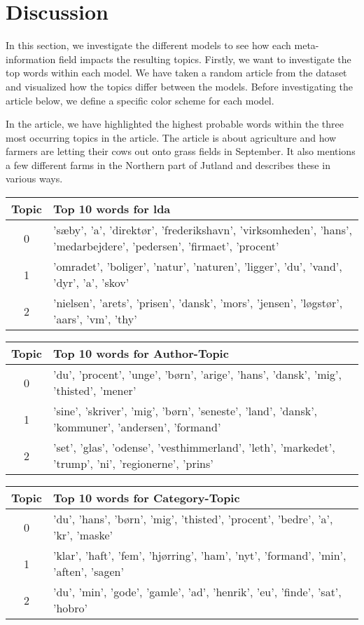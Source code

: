 \section{Discussion}\label{sec:discussion}
In this section, we investigate the different models to see how each meta-information field impacts the resulting topics.
Firstly, we want to investigate the top words within each model.
We have taken a random article from the dataset and visualized how the topics differ between the models. 
Before investigating the article below, we define a specific color scheme for each model.

In the article, we have highlighted the highest probable words within the three most occurring topics in the article.
The article is about agriculture and how farmers are letting their cows out onto grass fields in September. 
It also mentions a few different farms in the Northern part of Jutland and describes these in various ways.

\begin{table}
	\begin{tabular}{c|p{}}
		Topic & Top 10 words for \gls{lda} \\
		\toprule
		0 & 'sæby', 'a', 'direktør', 'frederikshavn', 'virksomheden', 'hans', 'medarbejdere', 'pedersen', 'firmaet', 'procent' \\
		1 & 'omradet', 'boliger', 'natur', 'naturen', 'ligger', 'du', 'vand', 'dyr', 'a', 'skov' \\
		2 & 'nielsen', 'arets', 'prisen', 'dansk', 'mors', 'jensen', 'løgstør', 'aars', 'vm', 'thy' \\
	\end{tabular}
	\begin{tabular}{c|p{}}
		Topic & Top 10 words for Author-Topic \\
		\toprule
		0 & 'du', 'procent', 'unge', 'børn', 'arige', 'hans', 'dansk', 'mig', 'thisted', 'mener'\\
		1 & 'sine', 'skriver', 'mig', 'børn', 'seneste', 'land', 'dansk', 'kommuner', 'andersen', 'formand' \\
		2 & 'set', 'glas', 'odense', 'vesthimmerland', 'leth', 'markedet', 'trump', 'ni', 'regionerne', 'prins'\\
	\end{tabular}
	\begin{tabular}{c|p{}}
		Topic & Top 10 words for Category-Topic \\
		\toprule
		0 & 'du', 'hans', 'børn', 'mig', 'thisted', 'procent', 'bedre', 'a', 'kr', 'maske' \\
		1 & 'klar', 'haft', 'fem', 'hjørring', 'ham', 'nyt', 'formand', 'min', 'aften', 'sagen'\\
		2 & 'du', 'min', 'gode', 'gamle', 'ad', 'henrik', 'eu', 'finde', 'sat', 'hobro'\\
	\end{tabular}
\label{tab:top_words_three_models}
\end{table}

